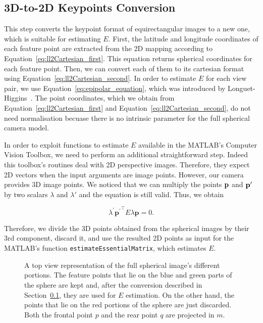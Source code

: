 \subsection{3D-to-2D Keypoints Conversion}
\label{sec:keypoints_conversion}
%
This step converts the keypoint format of equirectangular images to a new one, which is
suitable for estimating $E$.
%
First, the latitude and longitude coordinates of each feature point are 
extracted from the 2D mapping according to Equation~\ref{eq:ll2Cartesian_first}.
This equation returns spherical coordinates for each feature point. 
Then, we can convert each of them to its cartesian format using Equation~\ref{eq:ll2Cartesian_second}. 
%
In order to estimate $E$ for each view pair, we use Equation~\ref{eq:epipolar_equation}, which was
introduced by Longuet-Higgins~\cite{longuet1981computer}.
The point coordinates, which we obtain from Equation~\ref{eq:ll2Cartesian_first} and
Equation~\ref{eq:ll2Cartesian_second}, do not need normalisation becuase there
is no intrinsic parameter for the full spherical camera model.

In order to exploit functions to estimate $E$ available in the MATLAB's Computer Vision Toolbox, we need to perform an additional straightforward step.
%
Indeed this toolbox's routines deal with 2D perspective images. Therefore, they expect 
2D vectors when the input arguments are image points. However, our camera provides 3D image points.
We noticed that we can multiply the points $\mathbf{p}$ and $\mathbf{p}'$ by two 
scalars ${\lambda}$ and ${\lambda}'$ and the equation is still valid. Thus, we obtain

\begin{equation*}
\lambda^\prime{\mathbf{p}^\prime}^\top E\lambda\mathbf{p} = 0 \text{.}
\end{equation*}

Therefore, we divide the 3D points obtained from the spherical images by their 
3rd component, discard it, and use the resulted 2D points as input for the 
MATLAB's function {\tt estimateEssentialMatrix}, which estimates $E$.

\begin{figure}
    \centering
    \def\svgwidth{0.8\columnwidth}
    
    \caption{A top view representation of the full spherical image's 
    different portions.
    The feature points that lie on the blue and green parts of the sphere are kept and,
    after the conversion described in Section~\ref{sec:keypoints_conversion},
    they are used for $E$ estimation. On the other hand, the points that lie
    on the red portions of the sphere are just discarded.
    Both the frontal point $p$ and the rear point $q$ are projected in $m$.}
	\label{fig:sphere_division}
\end{figure}

